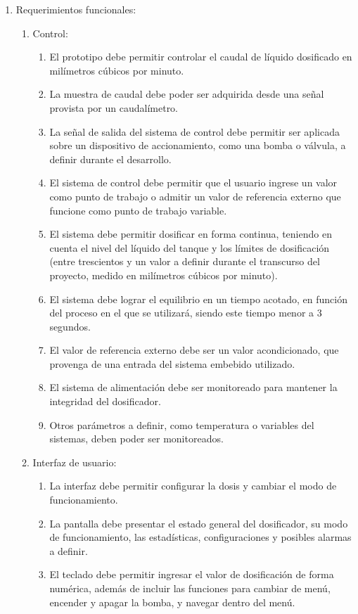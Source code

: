 \documentclass[
11pt, %
]{charter}
\begin{document}
\begin{enumerate}
	\item Requerimientos funcionales:
		\begin{enumerate}
			\item Control:
			\begin{enumerate}
			\item El prototipo debe permitir controlar el caudal de líquido dosificado en milímetros cúbicos por minuto.
			\item La muestra de caudal debe poder ser adquirida desde una señal provista por un caudalímetro.
			\item La señal de salida del sistema de control debe permitir ser aplicada sobre un dispositivo de accionamiento, como una bomba o válvula, a definir durante el desarrollo.
			\item El sistema de control debe permitir que el usuario ingrese un valor como punto de trabajo o admitir un valor de referencia externo que funcione como punto de trabajo variable.
			\item El sistema debe permitir dosificar en forma continua, teniendo en cuenta el nivel del líquido del tanque y los límites de dosificación (entre trescientos y un valor a definir durante el transcurso del proyecto, medido en milímetros cúbicos por minuto).
			\item El sistema debe lograr el equilibrio en un tiempo acotado, en función del proceso en el que se utilizará, siendo este tiempo menor a 3 segundos.			
			\item El valor de referencia externo debe ser un valor acondicionado, que provenga de una entrada del sistema embebido utilizado.
			\item El sistema de alimentación debe ser monitoreado para mantener la integridad del dosificador.
			\item Otros parámetros a definir, como temperatura o variables del sistemas, deben poder ser monitoreados.
			\end{enumerate}
			\item Interfaz de usuario:
			\begin{enumerate}
			\item La interfaz debe permitir configurar la dosis y cambiar el modo de funcionamiento.
			\item La pantalla debe presentar el estado general del dosificador, su modo de funcionamiento, las estadísticas, configuraciones y posibles alarmas a definir.
			\item El teclado debe permitir ingresar el valor de dosificación de forma numérica, además de incluir las funciones para cambiar de menú, encender y apagar la bomba, y navegar dentro del menú.

\end{enumerate}
\end{enumerate}
\end{enumerate}
\end{document}
